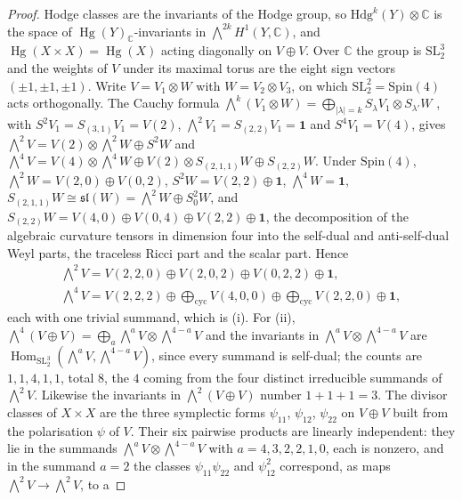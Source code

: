 \documentclass[11pt,reqno]{amsart}
\theoremstyle{plain}
\theoremstyle{definition}
\theoremstyle{remark}
\newcommand{\CC}{\mathbb{C}}
\newcommand{\Hdg}{\mathrm{Hdg}}
\DeclareMathOperator{\Hom}{Hom}
\DeclareMathOperator{\Hg}{Hg}
\begin{document}
\begin{proof}
Hodge classes are the invariants of the Hodge group, so
$\Hdg^{k}(Y)\otimes\CC$ is the space of $\Hg(Y)_{\CC}$-invariants in
$\bigwedge^{2k}H^{1}(Y,\CC)$, and $\Hg(X\times X)=\Hg(X)$ acting
diagonally on $V\oplus V$. Over $\CC$ the group is
$\mathrm{SL}_{2}^{3}$ and the weights of $V$ under its maximal torus are the
eight sign vectors $(\pm1,\pm1,\pm1)$. Write $V=V_{1}\otimes W$ with
$W=V_{2}\otimes V_{3}$, on which $\mathrm{SL}_{2}^{2}=\mathrm{Spin}(4)$ acts
orthogonally. The Cauchy formula
$\bigwedge^{k}(V_{1}\otimes W)=\bigoplus_{|\lambda|=k}S_{\lambda}V_{1}\otimes
S_{\lambda'}W$ \cite[\S6.1]{FH91}, with $S^{2}V_{1}=S_{(3,1)}V_{1}=V(2)$,
$\bigwedge^{2}V_{1}=S_{(2,2)}V_{1}=\mathbf{1}$ and $S^{4}V_{1}=V(4)$, gives
$\bigwedge^{2}V=V(2)\otimes\bigwedge^{2}W\oplus S^{2}W$ and
$\bigwedge^{4}V=V(4)\otimes\bigwedge^{4}W\oplus V(2)\otimes S_{(2,1,1)}W
\oplus S_{(2,2)}W$. Under $\mathrm{Spin}(4)$, $\bigwedge^{2}W=V(2,0)\oplus
V(0,2)$, $S^{2}W=V(2,2)\oplus\mathbf{1}$, $\bigwedge^{4}W=\mathbf{1}$,
$S_{(2,1,1)}W\cong\mathfrak{sl}(W)=\bigwedge^{2}W\oplus S^{2}_{0}W$, and
$S_{(2,2)}W=V(4,0)\oplus V(0,4)\oplus V(2,2)\oplus\mathbf{1}$, the
decomposition of the algebraic curvature tensors in dimension four into the
self-dual and anti-self-dual Weyl parts, the traceless Ricci part and the
scalar part. Hence
\begin{gather*}
  \textstyle\bigwedge^{2}V=V(2,2,0)\oplus V(2,0,2)\oplus V(0,2,2)\oplus\mathbf{1},\\
  \textstyle\bigwedge^{4}V=V(2,2,2)\oplus\bigoplus_{\text{cyc}}V(4,0,0)
  \oplus\bigoplus_{\text{cyc}}V(2,2,0)\oplus\mathbf{1},
\end{gather*}
each with one trivial summand, which is (i). For (ii),
$\bigwedge^{4}(V\oplus V)=\bigoplus_{a}\bigwedge^{a}V\otimes\bigwedge^{4-a}V$
and the invariants in $\bigwedge^{a}V\otimes\bigwedge^{4-a}V$ are
$\Hom_{\mathrm{SL}_{2}^{3}}(\bigwedge^{a}V,\bigwedge^{4-a}V)$, since every
summand is self-dual; the counts are $1,1,4,1,1$, total $8$, the $4$ coming
from the four distinct irreducible summands of $\bigwedge^{2}V$. Likewise the
invariants in $\bigwedge^{2}(V\oplus V)$ number $1+1+1=3$. The divisor
classes of $X\times X$ are the three symplectic forms $\psi_{11}$, $\psi_{12}$,
$\psi_{22}$ on $V\oplus V$ built from the polarisation $\psi$ of $V$. Their
six pairwise products are linearly independent: they lie in the summands
$\bigwedge^{a}V\otimes\bigwedge^{4-a}V$ with $a=4,3,2,2,1,0$, each is
nonzero, and in the summand $a=2$ the classes $\psi_{11}\psi_{22}$ and
$\psi_{12}^{2}$ correspond, as maps $\bigwedge^{2}V\to\bigwedge^{2}V$, to a

\end{proof}
\end{document}
